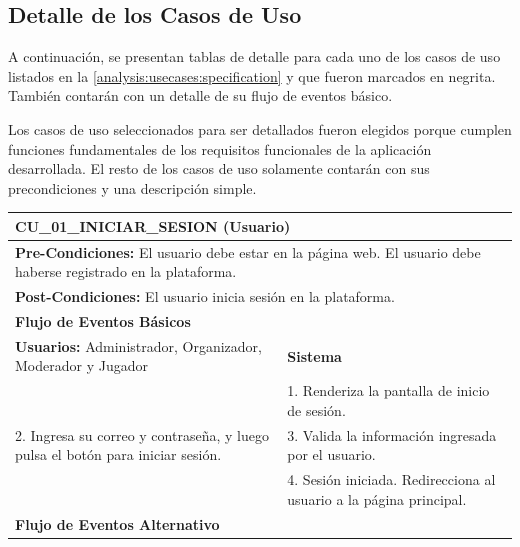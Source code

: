 \subsection{Detalle de los Casos de Uso}
A continuación, se presentan tablas de detalle para cada uno de los casos de uso listados en la \autoref{analysis:usecases:specification} y que fueron marcados en negrita. También contarán con un detalle de su flujo de eventos básico.

Los casos de uso seleccionados para ser detallados fueron elegidos porque cumplen funciones fundamentales de los requisitos funcionales de la aplicación desarrollada. El resto de los casos de uso solamente contarán con sus precondiciones y una descripción simple.

%
%

\begin{center}
  \begin{tabular}{| p{7.5cm} | p{7.5cm} |}
    \hline
    \multicolumn{2}{|p{15cm}|}{\textbf{CU\_01\_INICIAR\_SESION} (Usuario)} \\ \hline
    \multicolumn{2}{|p{15cm}|}{\textbf{Pre-Condiciones:} El usuario debe estar en la página web. El usuario debe haberse registrado en la plataforma.} \\ \hline
    \multicolumn{2}{|p{15cm}|}{\textbf{Post-Condiciones:} El usuario inicia sesión en la plataforma.} \\ \hline
    \multicolumn{2}{|p{7.5cm}|}{\textbf{Flujo de Eventos Básicos}} \\ \hline
    \multicolumn{1}{|p{7.5cm}|}{\textbf{Usuarios:} Administrador, Organizador, Moderador y Jugador} & \multicolumn{1}{|p{7.5cm}|}{\textbf{Sistema}} \\ \hline
    
    \multicolumn{1}{|p{7.5cm}|}{} & 
    \multicolumn{1}{|p{7.5cm}|}{1. Renderiza la pantalla de inicio de sesión.}\\ \hline
    
    \multicolumn{1}{|p{7.5cm}|}{2. Ingresa su correo y contraseña, y luego pulsa el botón para iniciar sesión.}& 
    \multicolumn{1}{|p{7.5cm}|}{3. Valida la información ingresada por el usuario.}\\ \hline
    
    \multicolumn{1}{|p{7.5cm}|}{} & 
    \multicolumn{1}{|p{7.5cm}|}{4. Sesión iniciada. Redirecciona al usuario a la página principal.}\\ \hline
    
    \multicolumn{2}{|p{7.5cm}|}{\textbf{Flujo de Eventos Alternativo}} \\ \hline
    

\end{tabular}
\end{center}

